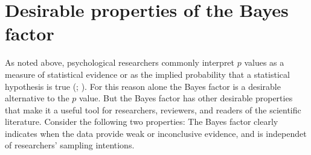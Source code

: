 \documentclass[
  man,
  floatsintext,
  longtable,
  nolmodern,
  notxfonts,
  notimes,
  colorlinks=true,linkcolor=blue,citecolor=blue,urlcolor=blue]{apa7}
\begin{document}
\section{Desirable properties of the Bayes
factor}\label{sec-desirable-properties}

As noted above, psychological researchers commonly interpret \(p\)
values as a measure of statistical evidence or as the implied
probability that a statistical hypothesis is true
(;
). For this reason alone
the Bayes factor is a desirable alternative to the \(p\) value. But the
Bayes factor has other desirable properties that make it a useful tool
for researchers, reviewers, and readers of the scientific literature.
Consider the following two properties: The Bayes factor clearly
indicates when the data provide weak or inconclusive evidence, and is
independet of researchers' sampling intentions.
\end{document}
